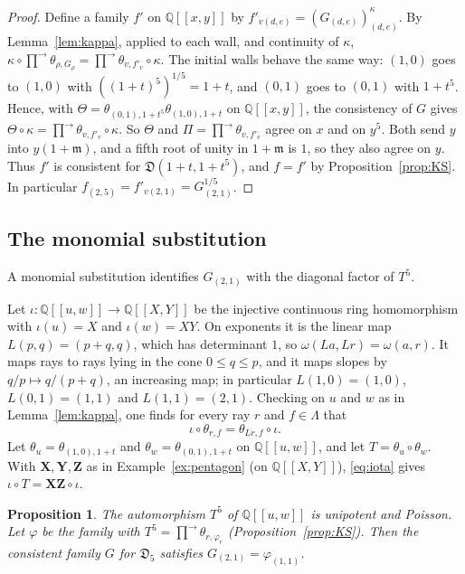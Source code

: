 \documentclass[11pt]{article}
\newtheorem{proposition}[theorem]{Proposition}
\theoremstyle{definition}
\theoremstyle{remark}
\numberwithin{equation}{section}
\newcommand{\Q}{\mathbb{Q}}
\newcommand{\ps}[1]{\Q[\![#1]\!]}
\newcommand{\m}{\mathfrak{m}}
\newcommand{\asc}{\textstyle\prod^{\rightarrow}}
\newcommand{\bX}{\mathbf{X}}
\newcommand{\bY}{\mathbf{Y}}
\newcommand{\bZ}{\mathbf{Z}}
\begin{document}
\begin{proof}
Define a family $f'$ on $\ps{x,y}$ by
$f'_{v(d,e)}=(G_{(d,e)})^{\kappa}_{(d,e)}$. By Lemma~\ref{lem:kappa},
applied to each wall, and continuity of $\kappa$,
$\kappa\circ\asc\theta_{\rho,G_\rho}=\asc\theta_{v,f'_v}\circ\kappa$. The
initial walls behave the same way: $(1,0)$ goes to $(1,0)$ with
$((1+t)^5)^{1/5}=1+t$, and $(0,1)$ goes to $(0,1)$ with $1+t^5$. Hence,
with $\Theta=\theta_{(0,1),1+t^5}\theta_{(1,0),1+t}$ on $\ps{x,y}$, the
consistency of $G$ gives $\Theta\circ\kappa=\asc\theta_{v,f'_v}\circ\kappa$.
So $\Theta$ and $\Pi=\asc\theta_{v,f'_v}$ agree on $x$ and on $y^5$. Both
send $y$ into $y(1+\m)$, and a fifth root of unity in $1+\m$ is $1$, so
they also agree on $y$. Thus $f'$ is consistent for
$\mathfrak{D}(1+t,1+t^5)$, and $f=f'$ by Proposition~\ref{prop:KS}. In
particular $f_{(2,5)}=f'_{v(2,1)}=G_{(2,1)}^{1/5}$.
\end{proof}

\subsection{The monomial substitution}\label{sec:T}

A monomial substitution identifies $G_{(2,1)}$ with the diagonal factor
of $T^5$.

Let $\iota\colon\ps{u,w}\to\ps{X,Y}$ be the injective continuous ring
homomorphism with $\iota(u)=X$ and $\iota(w)=XY$. On exponents it is the
linear map $L(p,q)=(p+q,q)$, which has determinant $1$, so
$\omega(La,Lr)=\omega(a,r)$. It maps rays to rays lying in the cone
$0\leq q\leq p$, and it maps slopes by $q/p\mapsto q/(p+q)$, an
increasing map; in particular $L(1,0)=(1,0)$, $L(0,1)=(1,1)$ and
$L(1,1)=(2,1)$. Checking on $u$ and $w$ as in Lemma~\ref{lem:kappa}, one
finds for every ray $r$ and $f\in\Lambda$ that
\begin{equation}\label{eq:iota}
  \iota\circ\theta_{r,f}=\theta_{Lr,f}\circ\iota .
\end{equation}
Let $\theta_u=\theta_{(1,0),1+t}$ and $\theta_w=\theta_{(0,1),1+t}$ on
$\ps{u,w}$, and let $T=\theta_u\circ\theta_w$. With $\bX,\bY,\bZ$ as in
Example~\ref{ex:pentagon} (on $\ps{X,Y}$), \eqref{eq:iota} gives
$\iota\circ T=\bX\bZ\circ\iota$.

\begin{proposition}\label{prop:T5}
The automorphism $T^5$ of $\ps{u,w}$ is unipotent and Poisson. Let
$\varphi$ be the family with $T^5=\asc\theta_{r,\varphi_r}$
(Proposition~\ref{prop:KS}). Then the consistent family $G$ for
$\mathfrak{D}_5$ satisfies $G_{(2,1)}=\varphi_{(1,1)}$.
\end{proposition}
\end{document}
